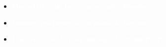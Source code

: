 \documentclass[aspectratio=169]{beamer}
\begin{document}
\begin{frame}
     {
        \begin{itemize}
            \item \textcolor{white}{\LARGE{\textbf{Deep-Dive sur les composantes Passives}}}
            \bigskip
            \item \textcolor{white}{\LARGE{\textbf{Bonnes pratiques de Schéma \& Layout}}}
            \bigskip
            \item \textcolor{white}{\LARGE{\textbf{Comment se déplace un signal sur un PCB}}}
        \end{itemize}
    }
\end{frame}
\end{document}

